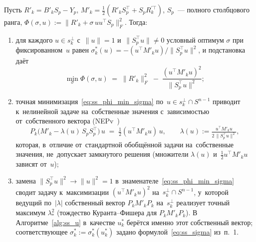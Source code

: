 \begin{lemma}
\label{lem:ss_variational}
Пусть $R'_k = B'_k S_p - Y_p$, $M'_k = \tfrac{1}{2}(R'_k S_p^\top + S_p R_k^{\prime\top})$,
$S_p$~--- полного столбцового ранга,
$\Phi(\sigma, u) := \|R'_k + \sigma\, u u^\top S_p\|_F^2$.
Тогда:
\begin{enumerate}
  \item для каждого $u\in s_k^\perp$ с~$\|u\|=1$ и~$\|S_p^\top u\|\ne 0$
    условный оптимум $\sigma$ при фиксированном~$u$ равен
    $\sigma_k^*(u) = -(u^\top M'_k u)/\|S_p^\top u\|^2$, и подстановка даёт
    \begin{equation}\label{eq:ss_phi_min_sigma}
      \min_\sigma \Phi(\sigma, u)
      \;=\; \|R'_k\|_F^2 \;-\; \frac{(u^\top M'_k u)^2}{\|S_p^\top u\|^2};
    \end{equation}
  \item точная минимизация~\eqref{eq:ss_phi_min_sigma} по~$u\in s_k^\perp \cap S^{n-1}$
    приводит к~нелинейной задаче на~собственные значения с~зависимостью
    от~собственного вектора (NEPv~\cite{cai2018nepv})
    \[
      P_k\bigl(M'_k - \lambda(u)\, S_p S_p^\top\bigr)\, u
      \;=\; \tfrac{1}{2}(u^\top M'_k u)\, u,
      \qquad \lambda(u) := \tfrac{u^\top M'_k u}{2\,\|S_p^\top u\|^2},
    \]
    которая, в~отличие от~стандартной обобщённой задачи на~собственные
    значения, не~допускает замкнутого решения (множители $\lambda(u)$
    и~$\tfrac12 u^\top M'_k u$ зависят от~$u$);
  \item замена $\|S_p^\top u\|^2 \to \|u\|^2 = 1$ в~знаменателе~\eqref{eq:ss_phi_min_sigma}
    сводит задачу к~максимизации $(u^\top M'_k u)^2$ на~$s_k^\perp\cap S^{n-1}$,
    у~которой ведущий по~$|\lambda|$ собственный вектор $P_k M'_k P_k$
    на~$s_k^\perp$ реализует точный максимум $\lambda_*^2$
    (тождество Куранта--Фишера для $P_k M'_k P_k$).
    В Алгоритме~\ref{alg:ss_u} в~качестве $u_k^*$ берётся именно этот
    собственный вектор; соответствующее $\sigma_k^* := \sigma_k^*(u_k^*)$ задано
    формулой~\eqref{eq:ss_sigma} из~п.~1.
\end{enumerate}
\end{lemma}


